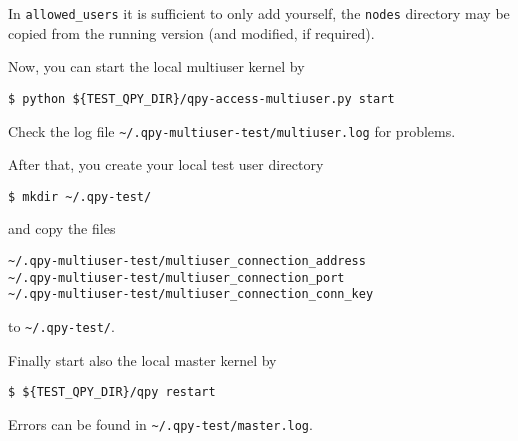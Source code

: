 \documentclass[a4paper,12pt]{article}
\begin{document}
In \verb+allowed_users+ it is sufficient to only add yourself, the \verb+nodes+ directory may be copied from the running version (and modified, if required).

Now, you can start the local multiuser kernel by
\begin{lstlisting}[style=BashStyle]
$ python ${TEST_QPY_DIR}/qpy-access-multiuser.py start
\end{lstlisting}
Check the log file \verb+~/.qpy-multiuser-test/multiuser.log+  for problems.

After that, you create your local test user directory
\begin{lstlisting}[style=BashStyle]
$ mkdir ~/.qpy-test/
\end{lstlisting}
and copy the files
\begin{verbatim}
~/.qpy-multiuser-test/multiuser_connection_address
~/.qpy-multiuser-test/multiuser_connection_port
~/.qpy-multiuser-test/multiuser_connection_conn_key
\end{verbatim}
to \verb+~/.qpy-test/+.

Finally start also the local master kernel by
\begin{lstlisting}[style=BashStyle]
$ ${TEST_QPY_DIR}/qpy restart
\end{lstlisting}
Errors can be found in \verb+~/.qpy-test/master.log+.




\end{document}
